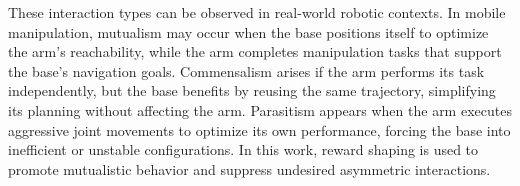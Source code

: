 These interaction types can be observed in real-world robotic contexts. In mobile manipulation, mutualism may occur when the base positions itself to optimize the arm’s reachability, while the arm completes manipulation tasks that support the base’s navigation goals. Commensalism arises if the arm performs its task independently, but the base benefits by reusing the same trajectory, simplifying its planning without affecting the arm. Parasitism appears when the arm executes aggressive joint movements to optimize its own performance, forcing the base into inefficient or unstable configurations. In this work, reward shaping is used to promote mutualistic behavior and suppress undesired asymmetric interactions.